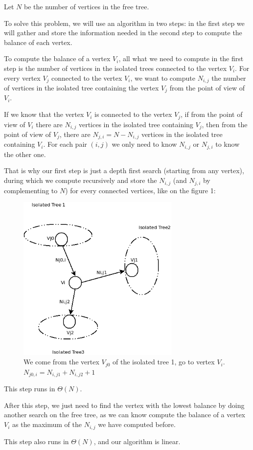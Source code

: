 Let $N$ be the number of vertices in the free tree.

To solve this problem, we will use an algorithm in two steps: in the first step we will gather and store the information needed in the second step to compute the balance of each vertex.

To compute the balance of a vertex $V_i$, all what we need to compute in the first step is the number of vertices in the isolated trees connected to the vertex $V_i$. For every vertex $V_j$ connected to the vertex $V_i$, we want to compute $N_{i,j}$ the number of vertices in the isolated tree containing the vertex $V_j$ from the point of view of $V_i$.

If we know that the vertex $V_i$ is connected to the vertex $V_j$, if from the point of view of $V_i$ there are $N_{i,j}$ vertices in the isolated tree containing $V_j$, then from the point of view of $V_j$, there are $N_{j,i} = N - N_{i,j}$ vertices in the isolated tree containing $V_i$.
For each pair $(i,j)$ we only need to know $N_{i,j}$ or $N_{j,i}$ to know the other one.

That is why our first step is just a depth first search (starting from any vertex), during which we compute recursively and store the $N_{i,j}$ (and $N_{j,i}$ by complementing to $N$) for every connected vertices, like on the figure 1:

\begin{figure}[h!]
\begin{center}
   \includegraphics[width=8cm]{IsolatedTreesDFS}
   \caption{We come from the vertex $V_{j0}$ of the isolated tree 1, go to vertex $V_i$. $N_{j0,i} = N_{i,j1} + N_{i,j2} + 1$}
\end{center}
\end{figure}

This step runs in $\Theta(N)$.

After this step, we just need to find the vertex with the lowest balance by doing another search on the free tree, as we can know compute the balance of a vertex $V_i$ as the maximum of the $N_{i,j}$ we have computed before.

This step also runs in $\Theta(N)$, and our algorithm is linear.